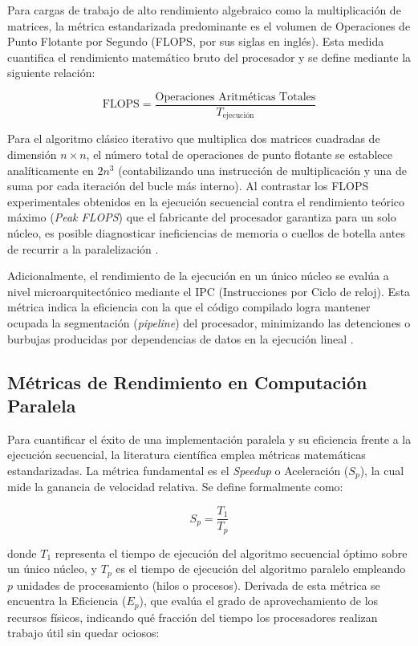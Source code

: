Para cargas de trabajo de alto rendimiento algebraico como la multiplicación de matrices, la métrica estandarizada predominante es el volumen de Operaciones de Punto Flotante por Segundo (FLOPS, por sus siglas en inglés). Esta medida cuantifica el rendimiento matemático bruto del procesador y se define mediante la siguiente relación:

\begin{equation}
    \text{FLOPS} = \frac{\text{Operaciones Aritméticas Totales}}{T_{\text{ejecución}}}
\end{equation}

Para el algoritmo clásico iterativo que multiplica dos matrices cuadradas de dimensión \(n \times n\), el número total de operaciones de punto flotante se establece analíticamente en \(2n^3\) (contabilizando una instrucción de multiplicación y una de suma por cada iteración del bucle más interno). Al contrastar los FLOPS experimentales obtenidos en la ejecución secuencial contra el rendimiento teórico máximo (\textit{Peak FLOPS}) que el fabricante del procesador garantiza para un solo núcleo, es posible diagnosticar ineficiencias de memoria o cuellos de botella antes de recurrir a la paralelización \parencite{Hager2010HPC}. 

Adicionalmente, el rendimiento de la ejecución en un único núcleo se evalúa a nivel microarquitectónico mediante el IPC (Instrucciones por Ciclo de reloj). Esta métrica indica la eficiencia con la que el código compilado logra mantener ocupada la segmentación (\textit{pipeline}) del procesador, minimizando las detenciones o burbujas producidas por dependencias de datos en la ejecución lineal \parencite{Yi2020CPI}.


\subsection{Métricas de Rendimiento en Computación Paralela}
Para cuantificar el éxito de una implementación paralela y su eficiencia frente a la ejecución secuencial, la literatura científica emplea métricas matemáticas estandarizadas. La métrica fundamental es el \textit{Speedup} o Aceleración (\(S_p\)), la cual mide la ganancia de velocidad relativa. Se define formalmente como:

\begin{equation}
    S_p = \frac{T_1}{T_p}
\end{equation}

donde \(T_1\) representa el tiempo de ejecución del algoritmo secuencial óptimo sobre un único núcleo, y \(T_p\) es el tiempo de ejecución del algoritmo paralelo empleando \(p\) unidades de procesamiento (hilos o procesos). Derivada de esta métrica se encuentra la Eficiencia (\(E_p\)), que evalúa el grado de aprovechamiento de los recursos físicos, indicando qué fracción del tiempo los procesadores realizan trabajo útil sin quedar ociosos:

